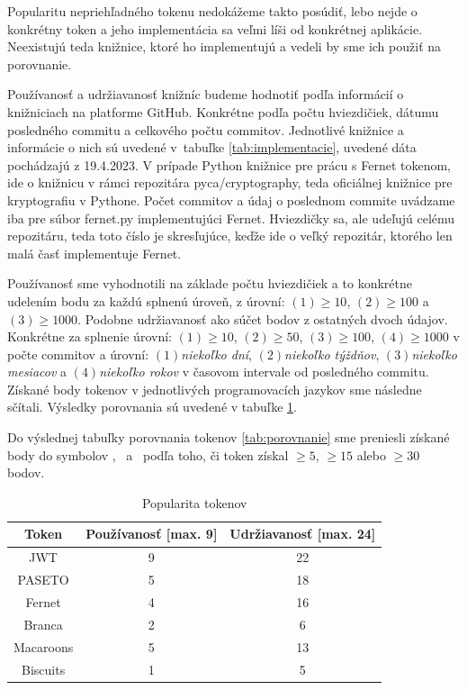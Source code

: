 Popularitu nepriehľadného tokenu nedokážeme takto posúdiť, lebo nejde o konkrétny token a jeho implementácia sa veľmi líši od konkrétnej aplikácie. Neexistujú teda knižnice, ktoré ho implementujú a vedeli by sme ich použiť na porovnanie.

Používanosť a udržiavanosť knižníc budeme hodnotiť podľa informácií o knižniciach na platforme GitHub. Konkrétne podľa počtu hviezdičiek, dátumu posledného commitu a celkového počtu commitov. Jednotlivé knižnice a informácie o nich sú uvedené v~tabuľke \ref{tab:implementacie}, uvedené dáta pochádzajú z 19.4.2023. V prípade Python knižnice pre prácu s Fernet tokenom, ide o knižnicu v rámci repozitára pyca/cryptography, teda oficiálnej knižnice pre kryptografiu v Pythone. Počet commitov a údaj o poslednom commite uvádzame iba pre súbor fernet.py implementujúci Fernet. Hviezdičky sa, ale udeľujú celému repozitáru, teda toto číslo je skresľujúce, keďže ide o veľký repozitár, ktorého len malá časť implementuje Fernet. 

Používanosť sme vyhodnotili na základe počtu hviezdičiek a to konkrétne udelením bodu za každú splnenú úroveň, z úrovní: $(1)\ge10$, $(2)\ge100$ a $(3)\ge1000$. Podobne udržiavanosť ako súčet bodov z ostatných dvoch údajov. Konkrétne za splnenie úrovní: $(1)\ge10$, $(2)\ge50$, $(3)\ge100$, $(4)\ge1000$ v počte commitov a úrovní: $(1)$\textit{niekoľko dní}, $(2)$\textit{niekoľko týždňov}, $(3)$\textit{niekoľko mesiacov} a $(4)$\textit{niekoľko rokov} v časovom intervale od posledného commitu. Získané body tokenov v jednotlivých programovacích jazykov sme následne sčítali. Výsledky porovnania sú uvedené v tabuľke \ref{tab:popularita}.

Do výslednej tabuľky porovnania tokenov \ref{tab:porovnanie} sme preniesli získané body do symbolov \Circle, \LEFTcircle ~a \CIRCLE ~podľa toho, či token získal $\ge5$, $\ge15$ alebo $\ge30$ bodov.

\begin{table}[H]
  \begin{center}
    \caption{Popularita tokenov}
    \label{tab:popularita} %

    \begin{tabular}{ccc}
      \hline
      Token & Používanosť [max. 9] & Udržiavanosť [max. 24]\\
      \hline
      JWT & 9 & 22 \\
      PASETO & 5 & 18 \\
      Fernet & 4 & 16 \\
      Branca & 2 & 6 \\
      Macaroons & 5 & 13 \\
      Biscuits & 1 & 5 \\
      \hline
    \end{tabular}
  \end{center}
\end{table}